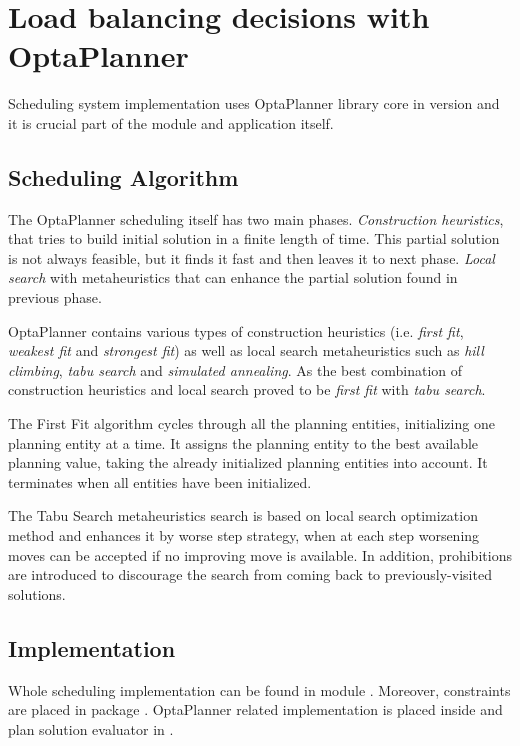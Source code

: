 \section{Load balancing decisions with OptaPlanner}\label{sec:load-balancing-optaplanner}

Scheduling system implementation uses OptaPlanner library core in version \cite{optaplannerDoc}
and it is crucial part of the  module and application itself.

\subsection{Scheduling Algorithm}
The OptaPlanner scheduling itself has two main phases.
\textit{Construction heuristics}, that tries to build initial solution in a finite length of time.
This partial solution is not always feasible, 
but it finds it fast and then leaves it to next phase.
\textit{Local search} with metaheuristics that can enhance the partial solution found in previous phase.

OptaPlanner contains various types of construction heuristics (i.e. \textit{first fit}, \textit{weakest fit} and \textit{strongest fit})
as well as local search metaheuristics such as \textit{hill climbing}, \textit{tabu search} and \textit{simulated annealing}.
As the best combination of construction heuristics and local search proved to be \textit{first fit} with \textit{tabu search}.

The First Fit algorithm cycles through all the planning entities,
initializing one planning entity at a time. 
It assigns the planning entity to the best available planning value, 
taking the already initialized planning entities into account.
It terminates when all entities have been initialized\cite{optaplannerDoc:heuristics}.

The Tabu Search metaheuristics search is based on local search optimization method
and enhances it by worse step strategy, 
when at each step worsening moves can be accepted if no improving move is available.
In addition, prohibitions are introduced to discourage the search from coming back to previously-visited solutions\cite{glover1989tabu}.

\subsection{Implementation}
Whole scheduling implementation can be found in module .
Moreover, 
constraints are placed in package .
OptaPlanner related implementation is placed inside 
and plan solution evaluator in .

